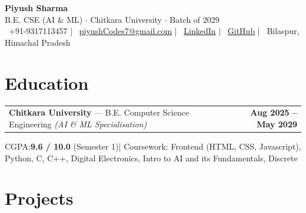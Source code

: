 \documentclass[10pt, letterpaper]{article}
\begin{document}
\begin{center}
    {\Huge \textbf{Piyush Sharma}} \\[1ex]
      {\fontsize{9pt}{11pt}\selectfont\color{lightgray}
    B.E. CSE (AI \& ML) $\cdot$ Chitkara University $\cdot$ Batch of 2029
  }\\[3pt]
    \small
\faPhone \ +91-9317113457 \quad|\quad
\faEnvelope \ \href{mailto:piyushCodes7}{piyushCodes7@gmail.com} \quad|\quad
\faLinkedin \ \href{https://linkedin.com/in/piyushCodes7}{LinkedIn} \quad|\quad
\faGithub \ \href{https://github.com/piyushCodes7}{GitHub} \quad|\quad
\faMapMarker* \ {Bilaspur, Himachal Pradesh}
\end{center}
\vspace{-1ex}

\section{Education}

\begin{tabularx}{\textwidth}{@{}X r@{}}
  \textbf{\fontsize{10pt}{12pt}\selectfont Chitkara University} — B.E. Computer Science Engineering \textit{(AI \& ML Specialisation)} &
  \textbf{Aug 2025 – May 2029}
\end{tabularx}
\vspace{1pt}

{\fontsize{9.2pt}{11pt}\selectfont\color{lightgray}
  CGPA:\;\textbf{\textcolor{accentblue}{9.6 / 10.0}} (Semester 1)\quad|\quad
  Coursework: Frontend (HTML, CSS, Javascript), Python, C, C++, Digital Electronics, Intro to AI and its Fundamentals, Discrete
}

\vspace{2pt}

\section{Projects}
\end{document}
